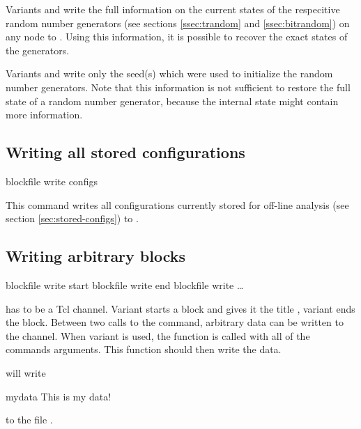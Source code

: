 Variants  and  write the full information on the
current states of the respecitive random number generators (see
sections \vref{ssec:trandom} and \vref{ssec:bitrandom}) on any node to
.  Using this information, it is possible to recover the
exact states of the generators.

Variants  and  write only the seed(s) which were
used to initialize the random number generators. Note that this
information is not sufficient to restore the full state of a random
number generator, because the internal state might contain more
information.

\subsection{Writing all stored configurations}
\label{sec:blockfile:configs}
\begin{essyntax}
  blockfile  write configs
\end{essyntax}

This command writes all configurations currently stored for off-line
analysis (see section \vref{sec:stored-configs}) to .

\subsection{Writing arbitrary blocks}

\begin{essyntax}
   blockfile  write start 
   blockfile  write end
   blockfile  write  \dots
\end{essyntax}

 has to be a Tcl channel. Variant  starts a
block and gives it the title , variant  ends the
block. Between two calls to the command, arbitrary data can be written
to the channel.  When variant  is used, the function
 is called with all of the commands
arguments. This function should then write the data.


will write 
\begin{tclcode}
{mydata {This is my data!}}
\end{tclcode}
to the file .

